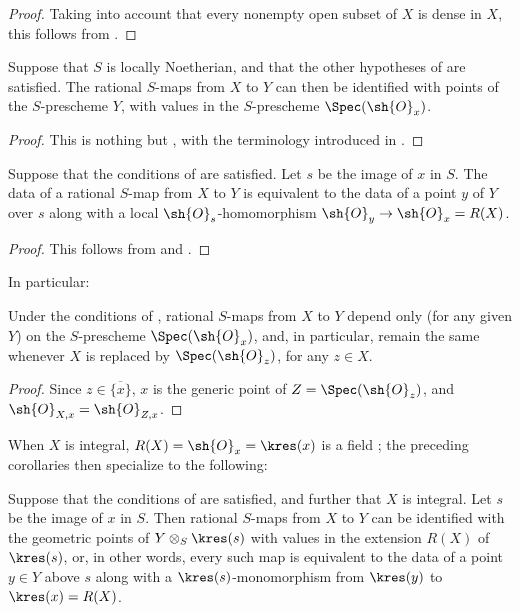 \begin{proof}
Taking into account that every nonempty open subset of $X$ is dense in $X$, this follows from .
\end{proof}

\begin{corollary}[7.1.12]
\label{I.7.1.12}
Suppose that $S$ is locally Noetherian, and that the other hypotheses of  are satisfied.
The rational $S$-maps from $X$ to $Y$ can then be identified with points of the $S$-prescheme $Y$, with values in the $S$-prescheme $\Spec(\sh{O}_x)$.
\end{corollary}

\begin{proof}
This is nothing but , with the terminology introduced in .
\end{proof}

\begin{corollary}[7.1.13]
\label{I.7.1.13}
Suppose that the conditions of  are satisfied.
Let $s$ be the image of $x$ in $S$.
The data of a rational $S$-map from $X$ to $Y$ is equivalent to the data of a point $y$ of $Y$ over $s$ along with a local $\sh{O}_s$-homomorphism $\sh{O}_y\to\sh{O}_x=R(X)$.
\end{corollary}

\begin{proof}
This follows from  and .
\end{proof}

In particular:
\begin{corollary}[7.1.14]
\label{I.7.1.14}
Under the conditions of , rational $S$-maps from $X$ to $Y$ depend only (for any given $Y$) on the $S$-prescheme $\Spec(\sh{O}_x)$, and, in particular, remain the same whenever $X$ is replaced by $\Spec(\sh{O}_z)$, for any $z\in X$.
\end{corollary}

\begin{proof}
Since $z\in\overline{\{x\}}$, $x$ is the generic point of $Z=\Spec(\sh{O}_z)$, and $\sh{O}_{X,x}=\sh{O}_{Z,x}$.
\end{proof}

When $X$ is integral, $R(X)=\sh{O}_x=\kres(x)$ is a field ; the preceding corollaries then specialize to the following:
\begin{corollary}[7.1.15]
\label{I.7.1.15}
Suppose that the conditions of  are satisfied, and further that $X$ is integral.
Let $s$ be the image of $x$ in $S$.
Then rational $S$-maps from $X$ to $Y$ can be identified with the geometric points of $Y\otimes_S\kres(s)$ with values in the extension $R(X)$ of $\kres(s)$, or, in other words, every such map is equivalent to the data of a point $y\in Y$ above $s$ along with a $\kres(s)$-monomorphism from $\kres(y)$ to $\kres(x)=R(X)$.
\end{corollary}

